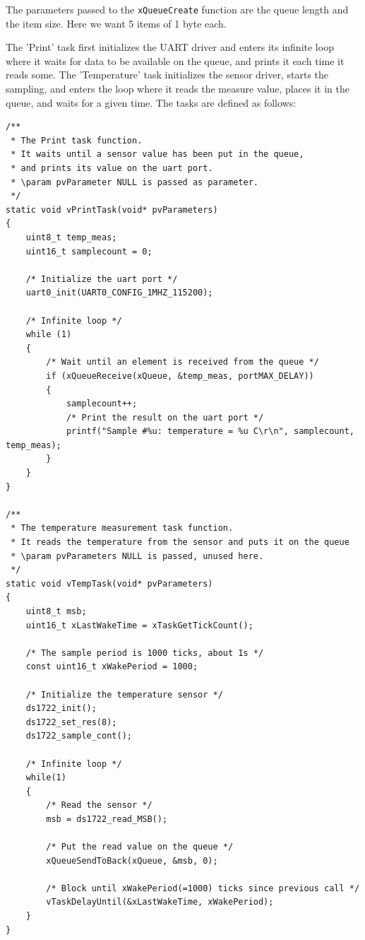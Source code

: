 \documentclass[11pt]{report}
\begin{document}
The parameters passed to the \verb$xQueueCreate$ function are the queue length and the item size. Here we want 5 items of 1 byte each.

The 'Print' task first initializes the UART driver and enters its infinite loop where it waits for data to be available on the queue, and prints it each time it reads some. The 'Temperature' task
initializes the sensor driver, starts the sampling, and enters the loop where it reads the measure value, places it in the queue, and waits for a given time. The tasks are defined as follows:
\begin{verbatim}
/**
 * The Print task function.
 * It waits until a sensor value has been put in the queue,
 * and prints its value on the uart port.
 * \param pvParameter NULL is passed as parameter.
 */
static void vPrintTask(void* pvParameters)
{
    uint8_t temp_meas;
    uint16_t samplecount = 0;
    
    /* Initialize the uart port */   
    uart0_init(UART0_CONFIG_1MHZ_115200);
    
    /* Infinite loop */
    while (1)
    {
        /* Wait until an element is received from the queue */
        if (xQueueReceive(xQueue, &temp_meas, portMAX_DELAY))
        {
            samplecount++;
            /* Print the result on the uart port */
            printf("Sample #%u: temperature = %u C\r\n", samplecount, temp_meas);
        }
    }
}

/**
 * The temperature measurement task function.
 * It reads the temperature from the sensor and puts it on the queue
 * \param pvParameters NULL is passed, unused here.
 */
static void vTempTask(void* pvParameters)
{
    uint8_t msb;
    uint16_t xLastWakeTime = xTaskGetTickCount();
    
    /* The sample period is 1000 ticks, about 1s */
    const uint16_t xWakePeriod = 1000;
    
    /* Initialize the temperature sensor */
    ds1722_init();
    ds1722_set_res(8);
    ds1722_sample_cont();
    
    /* Infinite loop */
    while(1)
    {
        /* Read the sensor */
        msb = ds1722_read_MSB();
        
        /* Put the read value on the queue */
        xQueueSendToBack(xQueue, &msb, 0);
        
        /* Block until xWakePeriod(=1000) ticks since previous call */
        vTaskDelayUntil(&xLastWakeTime, xWakePeriod);
    }
}
\end{verbatim}
\end{document}
